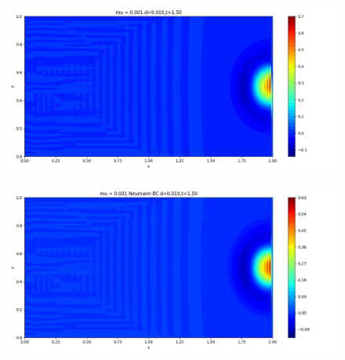 \documentclass[12pt]{article}
\begin{document}
\begin{figure}[H]
\begin{minipage}{\linewidth}
\begin{minipage}{0.5\textwidth}
\includegraphics[width=\linewidth]{figuresmu/mu3d0.010t1.50.png}
\label{fig5}
\end{minipage}\hfill
\begin{minipage}{0.5\textwidth}
\includegraphics[width=\linewidth]{figuresmu/mu3Nud0.010t1.50.png}
\label{fig6}
\end{minipage}
\vspace{-1.5em}


\end{minipage}
\end{figure}
\end{document}
